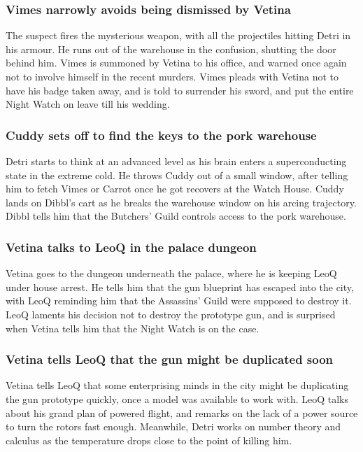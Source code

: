 \subsubsection{\Gls{Vimes} narrowly avoids being dismissed by \Gls{Vetina}}
The suspect fires the mysterious weapon, with all the projectiles hitting \Gls{Detri} in his armour.
He runs out of the warehouse in the confusion, shutting the door behind him. \Gls{Vimes} is summoned
by \Gls{Vetina} to his office, and warned once again not to involve himself in the recent murders.
\Gls{Vimes} pleads with \Gls{Vetina} not to have his badge taken away, and is told to surrender his
sword, and put the entire Night Watch on leave till his wedding.

\subsubsection{\Gls{Cuddy} sets off to find the keys to the pork warehouse}
\Gls{Detri} starts to think at an advanced level as his brain enters a superconducting state in the
extreme cold. He throws \Gls{Cuddy} out of a small window, after telling him to fetch \Gls{Vimes}
or \Gls{Carrot} once he got recovers at the Watch House. \Gls{Cuddy} lands on \Gls{Dibbl}'s cart
as he breaks the warehouse window on his arcing trajectory. \Gls{Dibbl} tells him that the Butchers'
Guild controls access to the pork warehouse.

\subsubsection{\Gls{Vetina} talks to \Gls{LeoQ} in the palace dungeon}
\Gls{Vetina} goes to the dungeon underneath the palace, where he is keeping \Gls{LeoQ} under house
arrest. He tells him that the gun blueprint has escaped into the city, with \Gls{LeoQ} reminding
him that the Assassins' Guild were supposed to destroy it. \Gls{LeoQ} laments his decision not to
destroy the prototype gun, and is surprised when \Gls{Vetina} tells him that the Night Watch is on
the case.

\subsubsection{\Gls{Vetina} tells \Gls{LeoQ} that the gun might be duplicated soon}
\Gls{Vetina} tells \Gls{LeoQ} that some enterprising minds in the city might be duplicating the
gun prototype quickly, once a model was available to work with. \Gls{LeoQ} talks about his grand
plan of powered flight, and remarks on the lack of a power source to turn the rotors fast enough.
Meanwhile, \Gls{Detri} works on number theory and calculus as the temperature drops close to the
point of killing him.


